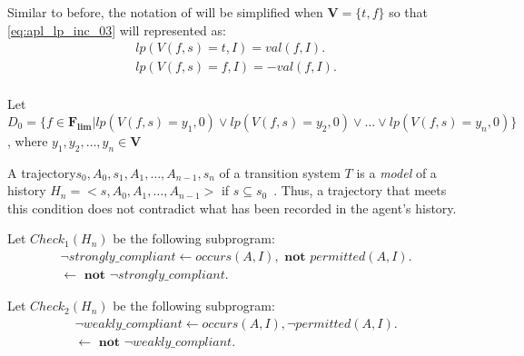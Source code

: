 Similar to before, the notation of \citet{gelfond_authorization_2008} will be simplified when $\boldsymbol{V}=\{t,f\}$ so that \cref{eq:apl_lp_inc_03} will represented as:
\begin{gather}
    lp\left(V(f,s)=t,I\right) =
        val\left(f,I\right). \\
    lp\left(V(f,s)=f,I\right) =
        -val\left(f,I\right). \\
\end{gather}

Let $D_0 = \{ f \in \boldsymbol{F_{lim}} | lp(V(f,s)=y_1, 0) \lor lp(V(f,s)=y_2, 0) \lor \dots \lor lp(V(f,s)=y_n, 0)\}$, where $y_1, y_2, \dots, y_n \in \boldsymbol{V}$

\begin{definition}
    \label{def:model_of_history}
    A trajectory\footnotemark $s_0, A_0, s_1, A_1, \dots, A_{n-1}, s_n$ of a transition system $T$ is a \textit{model} of a history $H_n = <s, A_0, A_1, \dots, A_{n-1}>$ if $s \subseteq s_0$~\citep{gelfond_authorization_2008}.
    Thus, a trajectory that meets this condition does not contradict what has been recorded in the agent's history.
\end{definition}

Let $Check_1(H_n)$ be the following subprogram:
\begin{gather}
    \neg strongly\_compliant \leftarrow occurs(A, I), \textbf{ not } permitted(A, I). \\
    \leftarrow \textbf{ not } \neg strongly\_compliant.
\end{gather}

Let $Check_2(H_n)$ be the following subprogram:
\begin{gather}
    \neg weakly\_compliant \leftarrow occurs(A, I), \neg permitted(A, I). \\
    \leftarrow \textbf{ not } \neg weakly\_compliant.
\end{gather}

